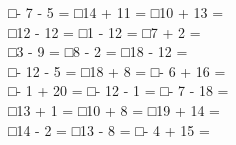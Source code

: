 \documentclass[uplatex,
paper=a4,
fontsize=18pt,
jafontsize=16pt,
number_of_lines=30,
line_length=30zh,
baselineskip=25pt,
]{jlreq}
\begin{document}
□\hspace{1em}- 7 - 5 =\hspace{2em} □\hspace{1em}14 + 11 =\hspace{2em} □\hspace{1em}10 + 13 =\hspace{2em} 
\\

□\hspace{1em}12 - 12 =\hspace{2em} □\hspace{1em}1 - 12 =\hspace{2em} □\hspace{1em}7 + 2 =\hspace{2em} 
\\

□\hspace{1em}3 - 9 =\hspace{2em} □\hspace{1em}8 - 2 =\hspace{2em} □\hspace{1em}18 - 12 =\hspace{2em} 
\\

□\hspace{1em}- 12 - 5 =\hspace{2em} □\hspace{1em}18 + 8 =\hspace{2em} □\hspace{1em}- 6 + 16 =\hspace{2em} 
\\

□\hspace{1em}- 1 + 20 =\hspace{2em} □\hspace{1em}- 12 - 1 =\hspace{2em} □\hspace{1em}- 7 - 18 =\hspace{2em} 
\\

□\hspace{1em}13 + 1 =\hspace{2em} □\hspace{1em}10 + 8 =\hspace{2em} □\hspace{1em}19 + 14 =\hspace{2em} 
\\

□\hspace{1em}14 - 2 =\hspace{2em} □\hspace{1em}13 - 8 =\hspace{2em} □\hspace{1em}- 4 + 15 =\hspace{2em} 
\\
\end{document}
